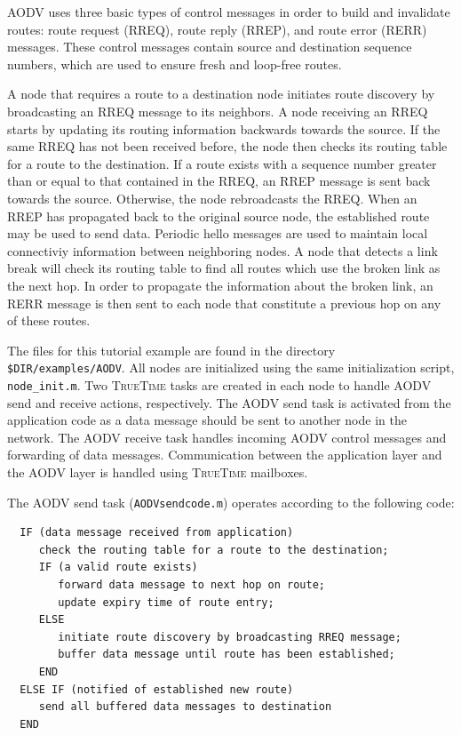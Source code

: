 \documentclass[final,twoside]{rapport}
\begin{document}
AODV uses three basic types of control messages in order to build and
invalidate routes: route request (RREQ), route reply (RREP), and route
error (RERR) messages. These control messages contain source and
destination sequence numbers, which are used to ensure fresh and
loop-free routes.

A node that requires a route to a destination node initiates route
discovery by broadcasting an RREQ message to its neighbors. A node
receiving an RREQ starts by updating its routing information backwards
towards the source. If the same RREQ has not been received before, the
node then checks its routing table for a route to the destination. If
a route exists with a sequence number greater than or equal to that
contained in the RREQ, an RREP message is sent back towards the
source. Otherwise, the node rebroadcasts the RREQ. When an RREP has
propagated back to the original source node, the established route may
be used to send data. Periodic hello messages are used to maintain
local connectiviy information between neighboring nodes. A node that
detects a link break will check its routing table to find all routes
which use the broken link as the next hop. In order to propagate the
information about the broken link, an RERR message is then sent to
each node that constitute a previous hop on any of these routes.

The files for this tutorial example are found in the directory
\texttt{\$DIR/examples/AODV}. All nodes are initialized using the same
initialization script, \texttt{node\_init.m}. Two \textsc{TrueTime}
tasks are created in each node to handle AODV send and receive
actions, respectively. The AODV send task is activated from the
application code as a data message should be sent to another node in
the network. The AODV receive task handles incoming AODV control
messages and forwarding of data messages. Communication between the
application layer and the AODV layer is handled using
\textsc{TrueTime} mailboxes.

The AODV send task (\texttt{AODVsendcode.m}) operates according to the
following code:

\begin{small} 
\begin{verbatim}
  IF (data message received from application)
     check the routing table for a route to the destination;
     IF (a valid route exists)
        forward data message to next hop on route;
        update expiry time of route entry;
     ELSE
        initiate route discovery by broadcasting RREQ message;
        buffer data message until route has been established;
     END
  ELSE IF (notified of established new route)
     send all buffered data messages to destination
  END
\end{verbatim}
\end{small} 
\end{document}
